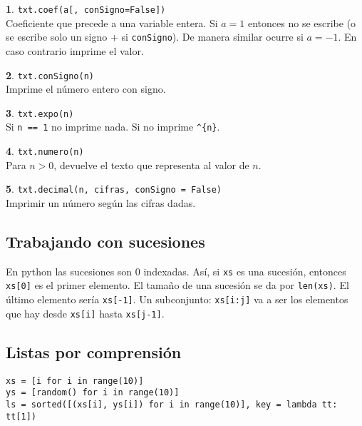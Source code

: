 \documentclass[12pt]{article}
\theoremstyle{definition}
\newtheorem{funcion}{}[section]
\begin{document}
\begin{funcion}
  \verb|txt.coef(a[, conSigno=False])| \\[1ex]
  Coeficiente que precede a una variable entera. Si $a=1$ entonces no se escribe (o se escribe solo un signo + si \verb|conSigno|). De manera similar ocurre si $a=-1$. En caso contrario imprime el valor.
\end{funcion}

\begin{funcion}
  \verb|txt.conSigno(n)| \\[1ex]
  Imprime el número entero con signo.
\end{funcion}

\begin{funcion}
  \verb|txt.expo(n)| \\[1ex]
  Si \verb|n == 1| no imprime nada. Si no imprime \verb|^{n}|.
\end{funcion}

\begin{funcion}
  \verb|txt.numero(n)| \\[1ex]
  Para $n > 0$, devuelve el texto que representa al valor de $n$.
\end{funcion}

\begin{funcion}
  \verb|txt.decimal(n, cifras, conSigno = False)| \\[1ex]
  Imprimir un número según las cifras dadas.
\end{funcion}

\subsection{Trabajando con sucesiones}

En python las sucesiones son 0 indexadas. Así, si \verb|xs| es una sucesión, entonces \verb|xs[0]| es el primer elemento. El tamaño de una sucesión se da por \verb|len(xs)|. El último elemento sería \verb|xs[-1]|. Un subconjunto: \verb|xs[i:j]| va a ser los elementos que hay desde \verb|xs[i]| hasta \verb|xs[j-1]|.

\subsection{Listas por comprensión}
\begin{verbatim}
xs = [i for i in range(10)]
ys = [random() for i in range(10)]
ls = sorted([(xs[i], ys[i]) for i in range(10)], key = lambda tt: tt[1])
\end{verbatim}
\end{document}
